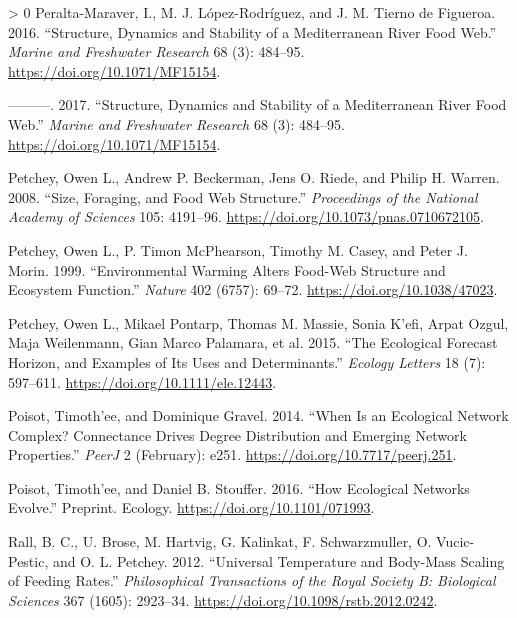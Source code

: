 \documentclass{article}
\newlength{\cslhangindent}
\newenvironment{CSLReferences}[3] %
 {%
  \setlength{\parindent}{0pt}
  \ifodd #1 \everypar{\setlength{\hangindent}{\cslhangindent}}\ignorespaces\fi
  \ifnum #2 > 0
  \setlength{\parskip}{#2\baselineskip}
  \fi
 }%
 {}
\begin{document}
\begin{CSLReferences}{1}{0}
\leavevmode\hypertarget{ref-peralta-maraverStructureDynamicsStability2016a}{}%
Peralta-Maraver, I., M. J. López-Rodríguez, and J. M. Tierno de
Figueroa. 2016. {``Structure, Dynamics and Stability of a
{Mediterranean} River Food Web.''} \emph{Marine and Freshwater Research}
68 (3): 484--95. \url{https://doi.org/10.1071/MF15154}.

\leavevmode\hypertarget{ref-peralta-maraverStructureDynamicsStability2017}{}%
---------. 2017. {``Structure, Dynamics and Stability of a
{Mediterranean} River Food Web.''} \emph{Marine and Freshwater Research}
68 (3): 484--95. \url{https://doi.org/10.1071/MF15154}.

\leavevmode\hypertarget{ref-petchey2008size}{}%
Petchey, Owen L., Andrew P. Beckerman, Jens O. Riede, and Philip H.
Warren. 2008. {``Size, Foraging, and Food Web Structure.''}
\emph{Proceedings of the National Academy of Sciences} 105: 4191--96.
\url{https://doi.org/10.1073/pnas.0710672105}.

\leavevmode\hypertarget{ref-petcheyEnvironmentalWarmingAlters1999}{}%
Petchey, Owen L., P. Timon McPhearson, Timothy M. Casey, and Peter J.
Morin. 1999. {``Environmental Warming Alters Food-Web Structure and
Ecosystem Function.''} \emph{Nature} 402 (6757): 69--72.
\url{https://doi.org/10.1038/47023}.

\leavevmode\hypertarget{ref-petcheyEcologicalForecastHorizon2015}{}%
Petchey, Owen L., Mikael Pontarp, Thomas M. Massie, Sonia K'efi, Arpat
Ozgul, Maja Weilenmann, Gian Marco Palamara, et al. 2015. {``The
Ecological Forecast Horizon, and Examples of Its Uses and
Determinants.''} \emph{Ecology Letters} 18 (7): 597--611.
\url{https://doi.org/10.1111/ele.12443}.

\leavevmode\hypertarget{ref-poisotWhenEcologicalNetwork2014}{}%
Poisot, Timoth'ee, and Dominique Gravel. 2014. {``When Is an Ecological
Network Complex? {Connectance} Drives Degree Distribution and Emerging
Network Properties.''} \emph{PeerJ} 2 (February): e251.
\url{https://doi.org/10.7717/peerj.251}.

\leavevmode\hypertarget{ref-poisotHowEcologicalNetworks2016}{}%
Poisot, Timoth'ee, and Daniel B. Stouffer. 2016. {``How Ecological
Networks Evolve.''} Preprint. {Ecology}.
\url{https://doi.org/10.1101/071993}.

\leavevmode\hypertarget{ref-rallUniversalTemperatureBodymass2012}{}%
Rall, B. C., U. Brose, M. Hartvig, G. Kalinkat, F. Schwarzmuller, O.
Vucic-Pestic, and O. L. Petchey. 2012. {``Universal Temperature and
Body-Mass Scaling of Feeding Rates.''} \emph{Philosophical Transactions
of the Royal Society B: Biological Sciences} 367 (1605): 2923--34.
\url{https://doi.org/10.1098/rstb.2012.0242}.


\end{CSLReferences}
\end{document}
